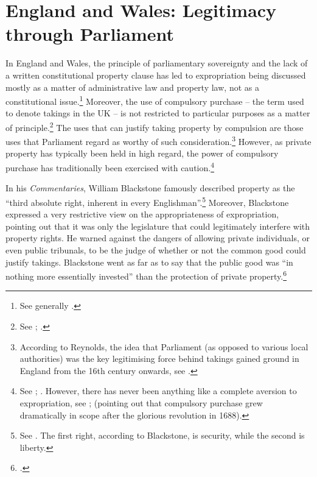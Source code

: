 \section{England and Wales: Legitimacy through Parliament}\label{sec:3:2}

In England and Wales, the principle of parliamentary sovereignty and the lack of a written constitutional property clause has led to expropriation being discussed mostly as a matter of administrative law and property law, not as a constitutional issue.\footnote{See generally \cite{taggart98}.} Moreover, the use of compulsory purchase -- the term used to denote takings in the UK -- is not restricted to particular purposes as a matter of principle.\footnote{See \cite[201]{allen00}; \cite[48-49]{waring09}.} The uses that can justify taking property by compulsion are those uses that Parliament regard as worthy of such consideration.\footnote{According to Reynolds, the idea that Parliament (as opposed to various local authorities) was the key legitimising force behind takings gained ground in England from the 16th century onwards, see \cite[41-42]{reynolds10}.} However, as private property has typically been held in high regard, the power of compulsory purchase has traditionally been exercised with caution.\footnote{See \cite[15]{allen00}; \cite[47-48]{waring09}. However, there has never been anything like a complete aversion to expropriation, see \cite[34-46]{reynolds10}; \cite[126-128]{hoppit11} (pointing out that compulsory purchase grew dramatically in scope after the glorious revolution in 1688).}

In his {\it Commentaries}, William Blackstone famously described property as the ``third absolute right, inherent in every Englishman''.\footnote{See \cite[134-135]{blackstone79}. The first right, according to Blackstone, is security, while the second is liberty.} Moreover, Blackstone expressed a very restrictive view on the appropriateness of expropriation, pointing out that it was only the legislature that could legitimately interfere with property rights. He warned against the dangers of allowing private individuals, or even public tribunals, to be the judge of whether or not the common good could justify takings. Blackstone went as far as to say that the public good was ``in nothing more essentially invested'' than the protection of private property.\footcite[134-135]{blackstone79}

